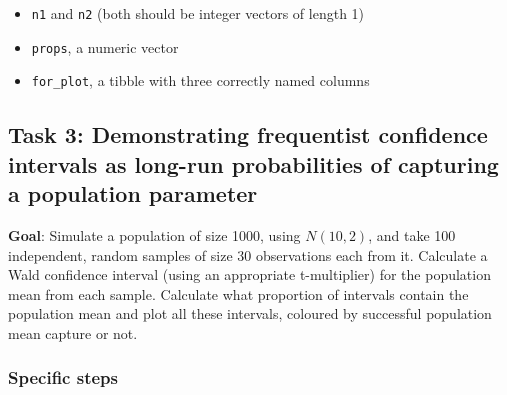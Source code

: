 \documentclass[
  openany]{book}
\providecommand{\tightlist}{%
  \setlength{\itemsep}{0pt}\setlength{\parskip}{0pt}}
\begin{document}
\begin{itemize}
\tightlist
\item
  \texttt{n1} and \texttt{n2} (both should be integer vectors of length 1)
\item
  \texttt{props}, a numeric vector
\item
  \texttt{for\_plot}, a tibble with three correctly named columns
\end{itemize}

\hypertarget{task-3-demonstrating-frequentist-confidence-intervals-as-long-run-probabilities-of-capturing-a-population-parameter}{%
\subsection{Task 3: Demonstrating frequentist confidence intervals as long-run probabilities of capturing a population parameter}\label{task-3-demonstrating-frequentist-confidence-intervals-as-long-run-probabilities-of-capturing-a-population-parameter}}

\textbf{Goal}: Simulate a population of size 1000, using \(N(10, 2)\), and take 100 independent, random samples of size 30 observations each from it. Calculate a Wald confidence interval (using an appropriate t-multiplier) for the population mean from each sample. Calculate what proportion of intervals contain the population mean and plot all these intervals, coloured by successful population mean capture or not.

\hypertarget{specific-steps}{%
\subsubsection{Specific steps}\label{specific-steps}}
\end{document}
